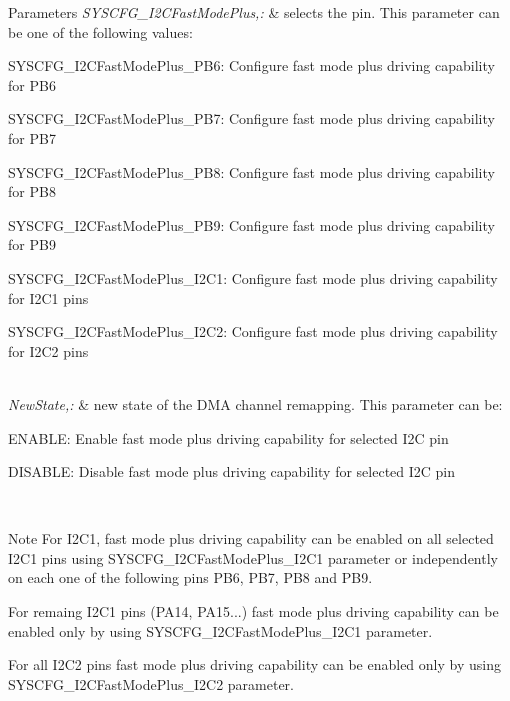 \begin{DoxyParams}{Parameters}
{\em S\-Y\-S\-C\-F\-G\-\_\-\-I2\-C\-Fast\-Mode\-Plus,\-:} & selects the pin. This parameter can be one of the following values\-: \begin{DoxyItemize}
\item S\-Y\-S\-C\-F\-G\-\_\-\-I2\-C\-Fast\-Mode\-Plus\-\_\-\-P\-B6\-: Configure fast mode plus driving capability for P\-B6 \item S\-Y\-S\-C\-F\-G\-\_\-\-I2\-C\-Fast\-Mode\-Plus\-\_\-\-P\-B7\-: Configure fast mode plus driving capability for P\-B7 \item S\-Y\-S\-C\-F\-G\-\_\-\-I2\-C\-Fast\-Mode\-Plus\-\_\-\-P\-B8\-: Configure fast mode plus driving capability for P\-B8 \item S\-Y\-S\-C\-F\-G\-\_\-\-I2\-C\-Fast\-Mode\-Plus\-\_\-\-P\-B9\-: Configure fast mode plus driving capability for P\-B9 \item S\-Y\-S\-C\-F\-G\-\_\-\-I2\-C\-Fast\-Mode\-Plus\-\_\-\-I2\-C1\-: Configure fast mode plus driving capability for I2\-C1 pins \item S\-Y\-S\-C\-F\-G\-\_\-\-I2\-C\-Fast\-Mode\-Plus\-\_\-\-I2\-C2\-: Configure fast mode plus driving capability for I2\-C2 pins \end{DoxyItemize}
\\
\hline
{\em New\-State,\-:} & new state of the D\-M\-A channel remapping. This parameter can be\-: \begin{DoxyItemize}
\item E\-N\-A\-B\-L\-E\-: Enable fast mode plus driving capability for selected I2\-C pin \item D\-I\-S\-A\-B\-L\-E\-: Disable fast mode plus driving capability for selected I2\-C pin \end{DoxyItemize}
\\
\hline
\end{DoxyParams}
\begin{DoxyNote}{Note}
For I2\-C1, fast mode plus driving capability can be enabled on all selected I2\-C1 pins using S\-Y\-S\-C\-F\-G\-\_\-\-I2\-C\-Fast\-Mode\-Plus\-\_\-\-I2\-C1 parameter or independently on each one of the following pins P\-B6, P\-B7, P\-B8 and P\-B9. 

For remaing I2\-C1 pins (P\-A14, P\-A15...) fast mode plus driving capability can be enabled only by using S\-Y\-S\-C\-F\-G\-\_\-\-I2\-C\-Fast\-Mode\-Plus\-\_\-\-I2\-C1 parameter. 

For all I2\-C2 pins fast mode plus driving capability can be enabled only by using S\-Y\-S\-C\-F\-G\-\_\-\-I2\-C\-Fast\-Mode\-Plus\-\_\-\-I2\-C2 parameter. 
\end{DoxyNote}

